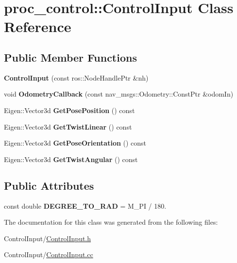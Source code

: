 \hypertarget{classproc__control_1_1_control_input}{}\section{proc\+\_\+control\+:\+:Control\+Input Class Reference}
\label{classproc__control_1_1_control_input}
\subsection*{Public Member Functions}
\begin{DoxyCompactItemize}
\item 
\mbox{\label{classproc__control_1_1_control_input_a7599f6620c8d4b61ced67ca9de195dbb}} 
{\bfseries Control\+Input} (const ros\+::\+Node\+Handle\+Ptr \&nh)
\item 
\mbox{\label{classproc__control_1_1_control_input_ad5757d3710f158a88aad9a7b70d87483}} 
void {\bfseries Odometry\+Callback} (const nav\+\_\+msgs\+::\+Odometry\+::\+Const\+Ptr \&odom\+In)
\item 
\mbox{\label{classproc__control_1_1_control_input_a7661dc7221a11d9db6ec41d88a8597f3}} 
Eigen\+::\+Vector3d {\bfseries Get\+Pose\+Position} () const
\item 
\mbox{\label{classproc__control_1_1_control_input_a8dcaf4b6b888b3e4282b45c84f9830cd}} 
Eigen\+::\+Vector3d {\bfseries Get\+Twist\+Linear} () const
\item 
\mbox{\label{classproc__control_1_1_control_input_a48426014ee76df6f552244146cd90b4a}} 
Eigen\+::\+Vector3d {\bfseries Get\+Pose\+Orientation} () const
\item 
\mbox{\label{classproc__control_1_1_control_input_a6cd6d9cc0a2d472d3b393c05d7b30a50}} 
Eigen\+::\+Vector3d {\bfseries Get\+Twist\+Angular} () const
\end{DoxyCompactItemize}
\subsection*{Public Attributes}
\begin{DoxyCompactItemize}
\item 
\mbox{\label{classproc__control_1_1_control_input_a9d7518257f6d068be167e3b0878dc032}} 
const double {\bfseries D\+E\+G\+R\+E\+E\+\_\+\+T\+O\+\_\+\+R\+AD} = M\+\_\+\+PI / 180.
\end{DoxyCompactItemize}


The documentation for this class was generated from the following files\+:\begin{DoxyCompactItemize}
\item 
Control\+Input/\hyperlink{_control_input_8h}{Control\+Input.\+h}\item 
Control\+Input/\hyperlink{_control_input_8cc}{Control\+Input.\+cc}\end{DoxyCompactItemize}
